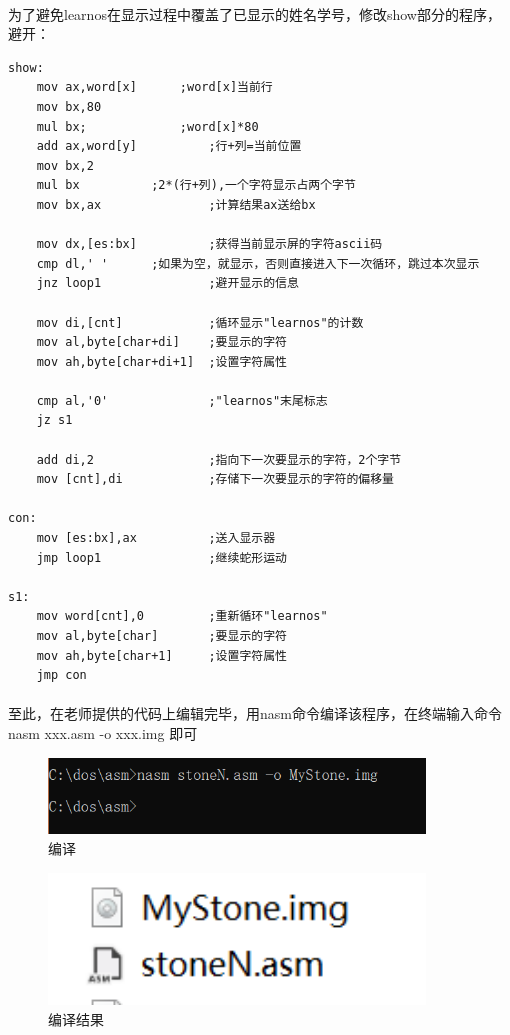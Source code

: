 \documentclass[12pt]{article}
\begin{document}
   \paragraph{}为了避免learnos在显示过程中覆盖了已显示的姓名学号，修改show部分的程序，避开：
\begin{lstlisting}
show:	
    mov ax,word[x]	    ;word[x]当前行
	mov bx,80
	mul bx;				;word[x]*80
	add ax,word[y]			;行+列=当前位置
	mov bx,2
	mul bx			;2*(行+列),一个字符显示占两个字节
	mov bx,ax				;计算结果ax送给bx

	mov dx,[es:bx]			;获得当前显示屏的字符ascii码
	cmp dl,' '		;如果为空，就显示，否则直接进入下一次循环，跳过本次显示
	jnz loop1				;避开显示的信息

	mov di,[cnt]			;循环显示"learnos"的计数
	mov al,byte[char+di]	;要显示的字符
	mov ah,byte[char+di+1]	;设置字符属性

	cmp al,'0'				;"learnos"末尾标志
	jz s1

	add di,2				;指向下一次要显示的字符，2个字节
	mov [cnt],di			;存储下一次要显示的字符的偏移量
		
con:
	mov [es:bx],ax  		;送入显示器
	jmp loop1				;继续蛇形运动

s1:
	mov word[cnt],0			;重新循环"learnos"
	mov al,byte[char]		;要显示的字符
	mov ah,byte[char+1]		;设置字符属性
	jmp con
\end{lstlisting}

	\paragraph{}至此，在老师提供的代码上编辑完毕，用nasm命令编译该程序，在终端输入命令nasm xxx.asm -o xxx.img 即可
	\begin{figure}[H]
			\centering
			\includegraphics[width=10cm]{./figures/asembly.png}
			\caption{编译} 
		\end{figure}	

	\begin{figure}[H]
			\centering
			\includegraphics[width=10cm]{./figures/success.png}
			\caption{编译结果} 
		\end{figure}	
\end{document}
